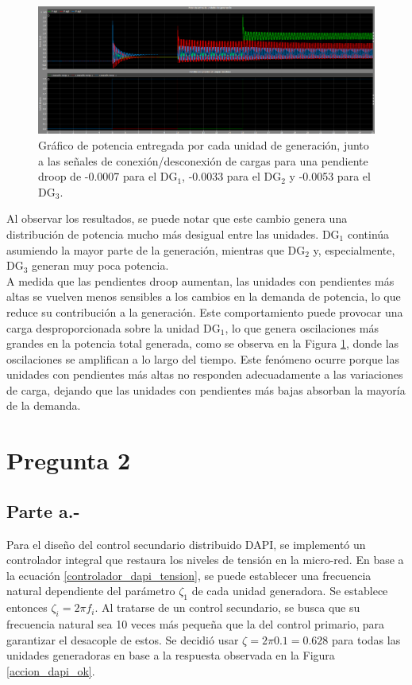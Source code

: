 \begin{figure}
    \centering
    \includegraphics[width=1.0\linewidth]{Tarea 2/report/imagenes/p1b/mp_dist_mal.png}
    \caption{Gráfico de potencia entregada por cada unidad de generación, junto a las señales de conexión/desconexión de cargas para una pendiente droop de -0.0007 para el DG$_1$, -0.0033 para el DG$_2$ y -0.0053 para el DG$_3$.}
    \label{mp_dist_mal}
\end{figure}

Al observar los resultados, se puede notar que este cambio genera una distribución de potencia mucho más desigual entre las unidades. DG$_1$ continúa asumiendo la mayor parte de la generación, mientras que DG$_2$ y, especialmente, DG$_3$ generan muy poca potencia.\\

A medida que las pendientes droop aumentan, las unidades con pendientes más altas se vuelven menos sensibles a los cambios en la demanda de potencia, lo que reduce su contribución a la generación. Este comportamiento puede provocar una carga desproporcionada sobre la unidad DG$_1$, lo que genera oscilaciones más grandes en la potencia total generada, como se observa en la Figura \ref{mp_dist_mal}, donde las oscilaciones se amplifican a lo largo del tiempo. Este fenómeno ocurre porque las unidades con pendientes más altas no responden adecuadamente a las variaciones de carga, dejando que las unidades con pendientes más bajas absorban la mayoría de la demanda.

\section{Pregunta 2}

\subsection{Parte a.-}

Para el diseño del control secundario distribuido DAPI, se implementó un controlador integral que restaura los niveles de tensión en la micro-red. En base a la ecuación \ref{controlador_dapi_tension}, se puede establecer una frecuencia natural dependiente del parámetro $\zeta_1$ de cada unidad generadora. Se establece entonces $\zeta_i = 2\pi f_{i}$. Al tratarse de un control secundario, se busca que su frecuencia natural sea 10 veces más pequeña que la del control primario, para garantizar el desacople de estos. Se decidió usar $\zeta = 2\pi 0.1 = 0.628$ para todas las unidades generadoras en base a la respuesta observada en la Figura \ref{accion_dapi_ok}. \\

